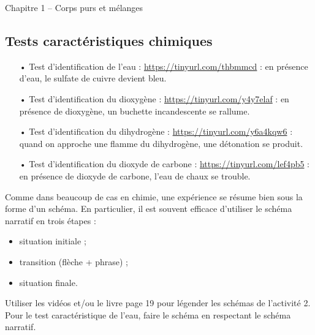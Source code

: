 



\begin{header}
Chapitre 1 -- Corps purs et mélanges
\end{header}


\subsection*{Tests caractéristiques chimiques}

\begin{itemize}
\item[•] Test d'identification de l'eau : \href{https://tinyurl.com/thbmmcd}{https://tinyurl.com/thbmmcd} : en présence d'eau, le sulfate de cuivre devient bleu.
\item[•] Test d'identification du dioxygène : \href{https://tinyurl.com/y4y7elaf}{https://tinyurl.com/y4y7elaf} : en présence de dioxygène, un buchette incandescente se rallume.
\item[•] Test d'identification du dihydrogène : \href{https://tinyurl.com/y6a4kqw6}{https://tinyurl.com/y6a4kqw6} : quand on approche une flamme du dihydrogène, une détonation se produit.
\item[•] Test d'identification du dioxyde de carbone : \href{https://tinyurl.com/lef4pb5}{https://tinyurl.com/lef4pb5} : en présence de dioxyde de carbone, l'eau de chaux se trouble.
\end{itemize}

\begin{conseil}
Comme dans beaucoup de cas en chimie, une expérience se résume bien sous la forme d'un schéma.
En particulier, il est souvent efficace d'utiliser le schéma narratif en trois étapes :
\begin{itemize}
\item situation initiale ;
\item transition (flèche + phrase) ;
\item situation finale.
\end{itemize}
\end{conseil}

\begin{conseil}
Utiliser les vidéos et/ou le livre page 19 pour légender les schémas de l'activité 2.
Pour le test caractéristique de l'eau, faire le schéma en respectant le schéma narratif.
\end{conseil}

